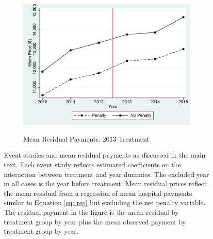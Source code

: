 \documentclass[12pt]{article}
\begin{document}
\begin{figure}[!htb]
\begin{subfigure}{.5\textwidth}
  \label{fig:sfig3}
\end{subfigure}%
\begin{subfigure}{.5\textwidth}
  \centering
  \caption{Mean Residual Payments: 2013 Treatment}
  \includegraphics[width=.8\linewidth]{price_resid_2013.pdf}
  \label{fig:sfig4}
\end{subfigure}
\caption*{\footnotesize{Event studies and mean residual payments as discussed in the main text. Each event study reflects estimated coefficients on the interaction between treatment and year dummies. The excluded year in all cases is the year before treatment. Mean residual prices reflect the mean residual from a regression of mean hospital payments similar to Equation \ref{eq: reg} but excluding the net penalty variable. The residual payment in the figure is the mean residual by treatment group by year plus the mean observed payment by treatment group by year.}}
\end{figure}
\end{document}
